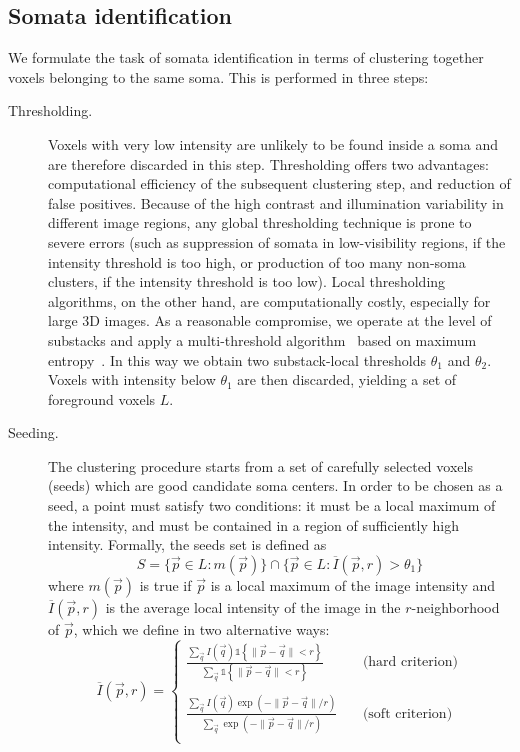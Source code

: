 \documentclass[smallextended]{svjour3}       %
\def\ONE#1{\mathds{1}\!\left\{#1\right\}}
\begin{document}
\subsection{Somata identification}
\label{sec:somata-identification}
We formulate the task of somata identification in terms of clustering
together voxels belonging to the same soma. This is performed in three
steps:
\begin{description}
\item[Thresholding.] Voxels with very low intensity are unlikely to be found
  inside a soma and are therefore discarded in this step. Thresholding
  offers two advantages: computational efficiency of the subsequent
  clustering step, and reduction of false positives. Because of the
  high contrast and illumination variability in different image
  regions, any global thresholding technique is prone to severe errors
  (such as suppression of somata in low-visibility regions, if the
  intensity threshold is too high, or production of too many non-soma
  clusters, if the intensity threshold is too low). Local thresholding
  algorithms, on the other hand, are computationally costly,
  especially for large 3D images.  As a reasonable compromise, we
  operate at the level of substacks and apply a multi-threshold
  algorithm~\cite{sahoo_survey_1988} based on maximum
  entropy~\cite{kapur_new_1985}. In this way we obtain two
  substack-local thresholds $\theta_1$ and $\theta_2$. Voxels with
  intensity below $\theta_1$ are then discarded, yielding a set
  of foreground voxels $L$.

\item[Seeding.] The clustering procedure starts from a set of
  carefully selected voxels (seeds) which are good candidate soma
  centers. In order to be chosen as a seed, a point must satisfy two
  conditions: it must be a local maximum of the intensity, and must be contained in
  a region of sufficiently high intensity. Formally, the seeds set is
  defined as
  $$
  S = \{\vec{p}\in L: m(\vec{p})\} \cap \{\vec{p}\in L: \overline{I}(\vec{p},r) > \theta_1\}
  $$
  where $m(\vec{p})$ is true if $\vec{p}$ is a local maximum of the
  image intensity and $\overline{I}(\vec{p},r)$ is the average local
  intensity of the image in the $r$-neighborhood of $\vec{p}$, which
  we define in two alternative ways:
  \begin{equation}
    \label{eq:neighborhood}
    \overline{I}(\vec{p},r) = \left\{
    \begin{array}{lll}
      \displaystyle
      \frac{\sum_{\vec{q}} I(\vec{q})\ONE{\|\vec{p}-\vec{q}\|<r}}{\sum_{\vec{q}} \ONE{\|\vec{p}-\vec{q}\|<r}}& ~ & \mbox{(hard criterion)}\\
      ~\\
      \displaystyle
      \frac{\sum_{\vec{q}} I(\vec{q})\exp(-\|\vec{p}-\vec{q}\|/r)} {\sum_{\vec{q}} \exp(-\|\vec{p}-\vec{q}\|/r)}& ~ & \mbox{(soft criterion)}\\
    \end{array}
    \right.
  \end{equation}


\end{description}
\end{document}

